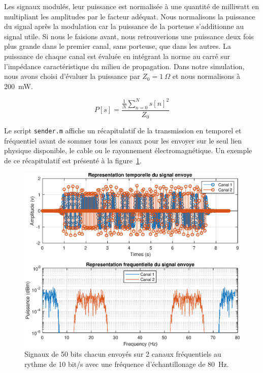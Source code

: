 \documentclass[10pt, oneside, a4paper]{article}
\begin{document}
Les signaux modulés, leur puissance est normalisée à une quantité de milliwatt en multipliant les amplitudes par le facteur adéquat.
Nous normalisons la puissance du signal après la modulation car la puissance de la porteuse s'additionne au signal utile.
Si nous le faisions avant, nous retrouverions une puissance deux fois plus grande dans le premier canal, sans porteuse, que dans les autres.
La puissance de chaque canal est évaluée en intégrant la norme au carré sur l'impédance caractéristique du milieu de propagation.
Dans notre simulation, nous avons choisi d'évaluer la puissance par $Z_0 = \SI{1}{\Omega}$ et nous normalisons à \SI{200}{\milli\watt}.

\begin{equation}
    P[s] = \frac{\frac{1}{N} \sum_{n = 0}^{N} s[n]^2}{Z_0}
\end{equation}

Le script \texttt{sender.m} affiche un récapitulatif de la transmission en temporel et fréquentiel avant de sommer tous les canaux pour les envoyer sur le seul lien physique disponible, le cable ou le rayonnement électromagnétique.
Un exemple de ce récapitulatif est présenté à la figure~\ref{fig:sender}.

\begin{figure}[p]
    \centering
    \includegraphics[height=0.45\textheight]{eps/sender.eps}
    \caption{Signaux de 50 bits chacun envoyés sur 2 canaux fréquentiels au rythme de 10 bit/s
             avec une fréquence d'échantillonage de \SI{80}{\hertz}.}
    \label{fig:sender}
\end{figure}
\end{document}

